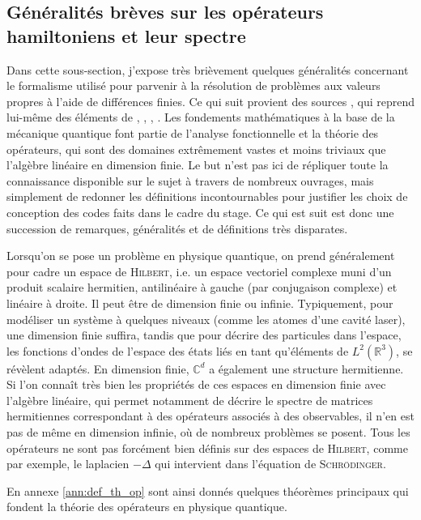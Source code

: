 \documentclass[svgnames,dvipsnames,a4paper,10pt,french]{report}
\begin{document}
\subsection{Généralités brèves sur les opérateurs hamiltoniens et leur spectre}

Dans cette sous-section, j'expose très brièvement quelques généralités concernant le formalisme utilisé pour parvenir à la résolution de problèmes aux valeurs propres à l'aide de différences finies. Ce qui suit provient des sources \cite{cances_introduction_2021}, qui reprend lui-même des éléments de \cite{reed_methods_1975}, \cite{reed_methods_1979}, \cite{reed_methods_1980}, \cite{reed_methods_1980-1}. Les fondements mathématiques à la base de la mécanique quantique font partie de l'analyse fonctionnelle et la théorie des opérateurs, qui sont des domaines extrêmement vastes et moins triviaux que l'algèbre linéaire en dimension finie. Le but n'est pas ici de répliquer toute la connaissance disponible sur le sujet à travers de nombreux ouvrages, mais simplement de redonner les définitions incontournables pour justifier les choix de conception des codes faits dans le cadre du stage. Ce qui est suit est donc une succession de remarques, généralités et de définitions très disparates. 

Lorsqu'on se pose un problème en physique quantique, on prend généralement pour cadre  un espace de \textsc{Hilbert}, i.e. un espace vectoriel complexe muni d'un produit scalaire hermitien, antilinéaire à gauche (par conjugaison complexe) et linéaire à droite. Il peut être de dimension finie ou infinie.  Typiquement, pour modéliser un système à quelques niveaux (comme les atomes d'une cavité laser), une dimension finie suffira, tandis que pour décrire des particules dans l'espace, les fonctions d'ondes de l'espace des états liés en tant qu'éléments de $L^2(\mathbb{R}^3)$, se révèlent adaptés. En dimension finie, $\mathbb{C}^d$ a également une structure hermitienne. Si l'on connaît très bien les propriétés de ces espaces en dimension finie avec l'algèbre linéaire, qui permet notamment de décrire le spectre de matrices hermitiennes correspondant à des opérateurs associés à des observables, il n'en est pas de même en dimension infinie, où de nombreux problèmes se posent. Tous les opérateurs ne sont pas forcément bien définis sur des espaces de \textsc{Hilbert}, comme par exemple, le laplacien $-\Delta$ qui intervient dans l'équation de \textsc{Schrödinger}. 

En annexe \ref{ann:def_th_op} sont ainsi donnés  quelques théorèmes principaux qui fondent la théorie des opérateurs en physique quantique.
\end{document}
